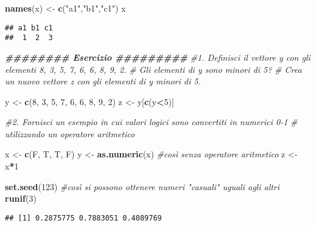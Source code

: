 \documentclass[
]{article}
\newenvironment{Shaded}{\begin{snugshade}}{\end{snugshade}}
\newcommand{\CommentTok}[1]{\textcolor[rgb]{0.56,0.35,0.01}{\textit{#1}}}
\newcommand{\DecValTok}[1]{\textcolor[rgb]{0.00,0.00,0.81}{#1}}
\newcommand{\DocumentationTok}[1]{\textcolor[rgb]{0.56,0.35,0.01}{\textbf{\textit{#1}}}}
\newcommand{\FunctionTok}[1]{\textcolor[rgb]{0.13,0.29,0.53}{\textbf{#1}}}
\newcommand{\NormalTok}[1]{#1}
\newcommand{\OtherTok}[1]{\textcolor[rgb]{0.56,0.35,0.01}{#1}}
\newcommand{\SpecialCharTok}[1]{\textcolor[rgb]{0.81,0.36,0.00}{\textbf{#1}}}
\newcommand{\StringTok}[1]{\textcolor[rgb]{0.31,0.60,0.02}{#1}}
\begin{document}
\begin{Shaded}
\begin{Highlighting}[]
\FunctionTok{names}\NormalTok{(x) }\OtherTok{\textless{}{-}} \FunctionTok{c}\NormalTok{(}\StringTok{"a1"}\NormalTok{,}\StringTok{"b1"}\NormalTok{,}\StringTok{"c1"}\NormalTok{)}
\NormalTok{x}
\end{Highlighting}
\end{Shaded}

\begin{verbatim}
## a1 b1 c1 
##  1  2  3
\end{verbatim}

\begin{Shaded}
\begin{Highlighting}[]
\DocumentationTok{\#\#\#\#\#\#\#\# Esercizio \#\#\#\#\#\#\#\#\#}
\CommentTok{\#1. Definisci il vettore y con gli elementi 8, 3, 5, 7, 6, 6, 8, 9, 2.}
\CommentTok{\# Gli elementi di y sono minori di 5? }
\CommentTok{\# Crea un nuovo vettore z con gli elementi di y minori di 5.}

\NormalTok{y }\OtherTok{\textless{}{-}} \FunctionTok{c}\NormalTok{(}\DecValTok{8}\NormalTok{, }\DecValTok{3}\NormalTok{, }\DecValTok{5}\NormalTok{, }\DecValTok{7}\NormalTok{, }\DecValTok{6}\NormalTok{, }\DecValTok{6}\NormalTok{, }\DecValTok{8}\NormalTok{, }\DecValTok{9}\NormalTok{, }\DecValTok{2}\NormalTok{)}
\NormalTok{z }\OtherTok{\textless{}{-}}\NormalTok{ y[}\FunctionTok{c}\NormalTok{(y}\SpecialCharTok{\textless{}}\DecValTok{5}\NormalTok{)]}


\CommentTok{\#2. Fornisci un esempio in cui valori logici sono convertiti in numerici 0{-}1}
\CommentTok{\# utilizzando un operatore aritmetico}

\NormalTok{x }\OtherTok{\textless{}{-}} \FunctionTok{c}\NormalTok{(F, T, T, F)}
\NormalTok{y }\OtherTok{\textless{}{-}} \FunctionTok{as.numeric}\NormalTok{(x) }\CommentTok{\#così senza operatore aritmetico}
\NormalTok{z }\OtherTok{\textless{}{-}}\NormalTok{ x}\SpecialCharTok{*}\DecValTok{1}

\FunctionTok{set.seed}\NormalTok{(}\DecValTok{123}\NormalTok{) }\CommentTok{\#così si possono ottenere numeri "casuali" uguali agli altri}
\FunctionTok{runif}\NormalTok{(}\DecValTok{3}\NormalTok{)}
\end{Highlighting}
\end{Shaded}

\begin{verbatim}
## [1] 0.2875775 0.7883051 0.4089769
\end{verbatim}
\end{document}
